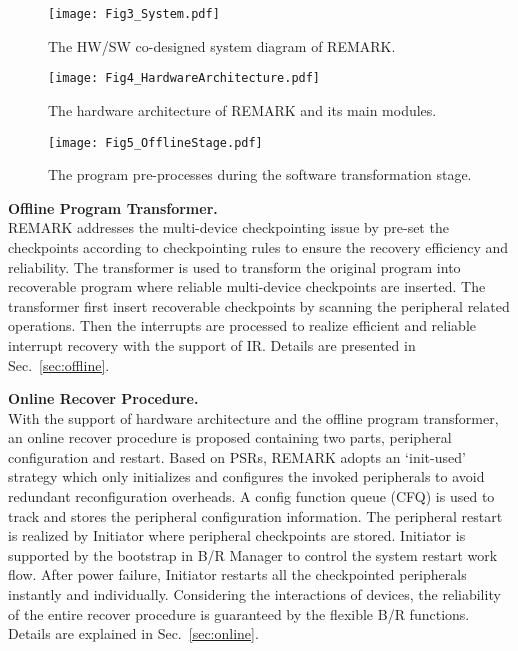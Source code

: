 \begin{figure*}[!htbp]
    \centering
    \texttt{[image: Fig3\_System.pdf]}
    \caption{The HW/SW co-designed system diagram of REMARK.}
    \label{fig:SystemArchitecture}
\end{figure*}

%
\begin{figure*}[!htpb]
    \centering
    \texttt{[image: Fig4\_HardwareArchitecture.pdf]}
    \caption{The hardware architecture of REMARK and its main modules. }
    \label{fig:HardwareArchitecture}
\end{figure*}

\begin{figure*}[!htbp]
    \centering
    \texttt{[image: Fig5\_OfflineStage.pdf]}
    \caption{The program pre-processes during the software transformation stage.}
    \label{fig:OfflineStage}
\end{figure*}

\noindent\textbf{Offline Program Transformer.} \\
REMARK addresses the multi-device checkpointing issue by pre-set the checkpoints according to checkpointing rules to ensure the recovery efficiency and reliability.
The transformer is used to transform the original program into recoverable program where reliable multi-device checkpoints are inserted.
The transformer first insert recoverable checkpoints by scanning the peripheral related operations.
Then the interrupts are processed to realize efficient and reliable interrupt recovery with the support of IR.
Details are presented in Sec.~\ref{sec:offline}.


\noindent\textbf{Online Recover Procedure.} \\
With the support of hardware architecture and the offline program transformer, an online recover procedure is proposed containing two parts, peripheral configuration and restart.
Based on PSRs, REMARK adopts an `init-used' strategy which only initializes and configures the invoked peripherals to avoid redundant reconfiguration overheads.
A config function queue (CFQ) is used to track and stores the peripheral configuration information.
The peripheral restart is realized by Initiator where peripheral checkpoints are stored.
Initiator is supported by the bootstrap in B/R Manager to control the system restart work flow.
After power failure, Initiator restarts all the checkpointed peripherals instantly and individually.
Considering the interactions of devices, the reliability of the entire recover procedure is guaranteed by the flexible B/R functions.
Details are explained in Sec.~\ref{sec:online}.



